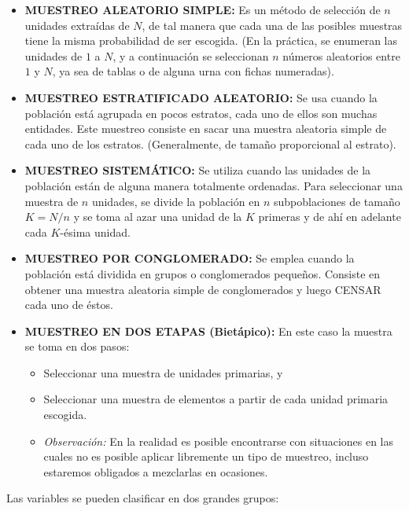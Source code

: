 \begin{itemize}
    \item \textbf{MUESTREO ALEATORIO SIMPLE:} Es un m\'etodo de selecci\'on de $n$ unidades extra\'idas de $N$, de tal manera que cada una de las posibles muestras tiene la misma probabilidad de ser escogida. (En la pr\'actica, se enumeran las unidades de $1$ a $N$, y a continuaci\'on se seleccionan $n$ n\'umeros aleatorios entre $1$ y $N$, ya sea de tablas o de alguna urna con fichas numeradas).
    \item \textbf{MUESTREO ESTRATIFICADO ALEATORIO:} Se usa cuando la poblaci\'on est\'a agrupada en pocos estratos, cada uno de ellos son muchas entidades. Este muestreo consiste en sacar una muestra aleatoria simple de cada uno de los estratos. (Generalmente, de tama\~no proporcional al estrato).
    \item \textbf{MUESTREO SISTEM\'ATICO:} Se utiliza cuando las unidades de la poblaci\'on est\'an de alguna manera totalmente ordenadas. Para seleccionar una muestra de $n$ unidades, se divide la poblaci\'on en $n$ subpoblaciones de tama\~no $K = N/n$ y se toma al azar una unidad de la $K$ primeras y de ah\'i en adelante cada $K$-\'esima unidad.
    \item \textbf{MUESTREO POR CONGLOMERADO:} Se emplea cuando la poblaci\'on est\'a dividida en grupos o conglomerados peque\~nos. Consiste en obtener una muestra aleatoria simple de conglomerados y luego CENSAR cada uno de \'estos.
    \item \textbf{MUESTREO EN DOS ETAPAS (Biet\'apico):} En este caso la muestra se toma en dos pasos:
    \begin{itemize}
        \item Seleccionar una muestra de unidades primarias, y 
        \item Seleccionar una muestra de elementos a partir de cada unidad primaria escogida.
        \item \textit{Observaci\'on:} En la realidad es posible encontrarse con situaciones en las cuales no es posible aplicar libremente un tipo de muestreo, incluso estaremos obligados a mezclarlas en ocasiones.
    \end{itemize}
\end{itemize}

Las variables se pueden clasificar en dos grandes grupos:


